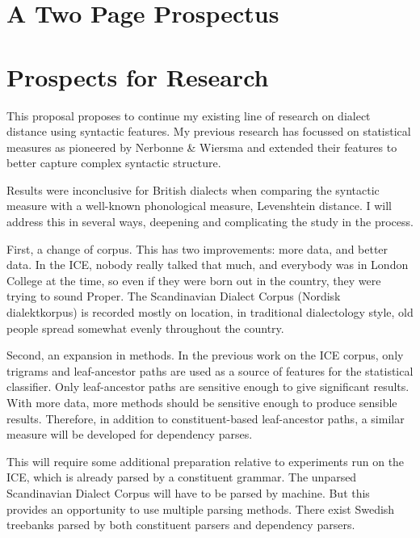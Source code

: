 \documentclass[11pt]{article}
\begin{document}
\section*{A Two Page Prospectus}
\section*{Prospects for Research}

This proposal proposes to continue my existing line of research on
dialect distance using syntactic features. My previous research has
focussed on statistical measures as pioneered by Nerbonne \& Wiersma
and extended their features to better capture complex syntactic
structure.

Results were inconclusive for British dialects when comparing the
syntactic measure with a well-known phonological measure, Levenshtein
distance. I will address this in several ways, deepening and
complicating the study in the process.

First, a change of corpus. This
has two improvements: more data, and better data. In the ICE, nobody
really talked that much, and everybody was in London College at the
time, so even if they were born out in the country, they were trying
to sound Proper. The Scandinavian Dialect Corpus
(Nordisk dialektkorpus) is recorded mostly on location, in traditional
dialectology style, old people spread somewhat evenly throughout the
country.

Second, an expansion in methods. In the previous work on the ICE
corpus, only trigrams and leaf-ancestor paths are used as a source of
features for the statistical classifier. Only leaf-ancestor paths are
sensitive enough to give significant results. With more data, more
methods should be sensitive enough to produce sensible
results. Therefore, in addition to constituent-based leaf-ancestor
paths, a similar measure will be developed for dependency parses.

This will require some additional preparation relative to experiments
run on the ICE, which is already parsed by a constituent grammar. The
unparsed Scandinavian Dialect Corpus will have to be parsed by
machine. But this provides an opportunity to use multiple parsing
methods. There exist Swedish treebanks parsed by both constituent parsers and
dependency parsers.
\end{document}
